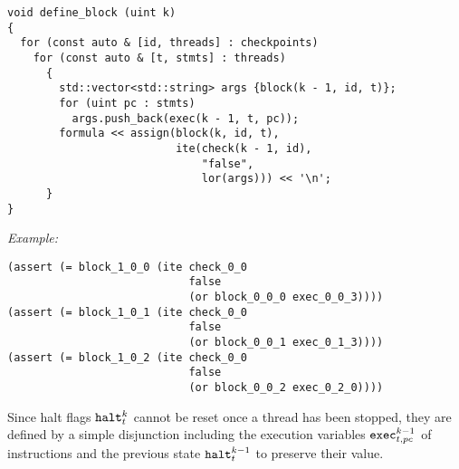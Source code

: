 \begin{lstlisting}[style=c++]
void define_block (uint k)
{
  for (const auto & [id, threads] : checkpoints)
    for (const auto & [t, stmts] : threads)
      {
        std::vector<std::string> args {block(k - 1, id, t)};
        for (uint pc : stmts)
          args.push_back(exec(k - 1, t, pc));
        formula << assign(block(k, id, t),
                          ite(check(k - 1, id),
                              "false",
                              lor(args))) << '\n';
      }
}
\end{lstlisting}

\noindent
\emph{Example:} 

\begin{lstlisting}[style=smtlib]
(assert (= block_1_0_0 (ite check_0_0
                            false
                            (or block_0_0_0 exec_0_0_3))))
(assert (= block_1_0_1 (ite check_0_0
                            false
                            (or block_0_0_1 exec_0_1_3))))
(assert (= block_1_0_2 (ite check_0_0
                            false
                            (or block_0_0_2 exec_0_2_0))))
\end{lstlisting}



\newpage

\noindent
Since halt flags $\texttt{halt}^k_t$ cannot be reset once a thread has been stopped, they are defined by a simple disjunction including the execution variables $\texttt{exec}^{k - 1}_{t, pc}$ of  instructions and the previous state $\texttt{halt}^{k - 1}_t$ to preserve their value.

